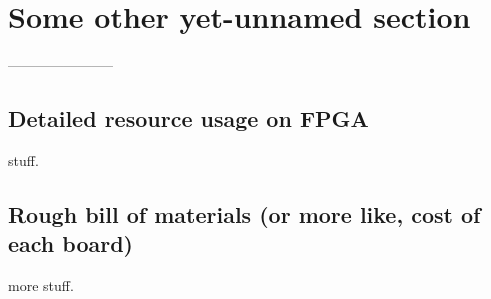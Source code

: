 \chapter{Some other yet-unnamed section}
-----------------------

\section{Detailed resource usage on FPGA}
stuff.

\section{Rough bill of materials (or more like, cost of each board)}
more stuff.

